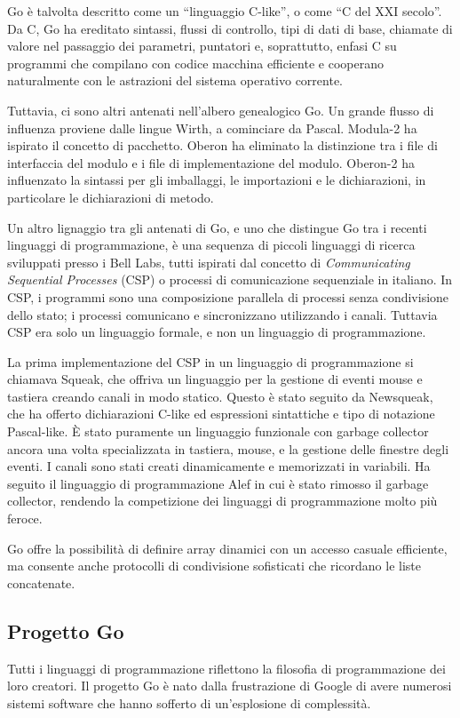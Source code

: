 %
Go è talvolta descritto come un ``linguaggio C-like'', o come ``C del XXI secolo''.
Da C, Go ha ereditato sintassi, flussi di controllo, tipi di dati di base, chiamate di valore nel passaggio dei parametri, puntatori e, soprattutto, enfasi C su programmi che compilano con codice macchina efficiente e cooperano naturalmente con le astrazioni del sistema operativo corrente.

Tuttavia, ci sono altri antenati nell'albero genealogico Go.
Un grande flusso di influenza proviene dalle lingue Wirth, a cominciare da Pascal.
Modula-2 ha ispirato il concetto di pacchetto.
Oberon ha eliminato la distinzione tra i file di interfaccia del modulo e i file di implementazione del modulo.
Oberon-2 ha influenzato la sintassi per gli imballaggi, le importazioni e le dichiarazioni, in particolare le dichiarazioni di metodo.

Un altro lignaggio tra gli antenati di Go, e uno che distingue Go tra i recenti linguaggi di programmazione, è una sequenza di piccoli linguaggi di ricerca sviluppati presso i Bell Labs, tutti ispirati dal concetto di \textit{Communicating Sequential Processes} (CSP) o processi di comunicazione sequenziale in italiano.
In CSP, i programmi sono una composizione parallela di processi senza condivisione dello stato;
i processi comunicano e sincronizzano utilizzando i canali.
Tuttavia CSP era solo un linguaggio formale, e non un linguaggio di programmazione.

La prima implementazione del CSP in un linguaggio di programmazione si chiamava Squeak, che offriva un linguaggio per la gestione di eventi mouse e tastiera creando canali in modo statico.
Questo è stato seguito da Newsqueak, che ha offerto dichiarazioni C-like ed espressioni sintattiche e tipo di notazione Pascal-like.
È stato puramente un linguaggio funzionale con garbage collector ancora una volta specializzata in tastiera, mouse, e la gestione delle finestre degli eventi.
I canali sono stati creati dinamicamente e memorizzati in variabili.
Ha seguito il linguaggio di programmazione Alef in cui è stato rimosso il garbage collector, rendendo la competizione dei linguaggi di programmazione molto più feroce.

Go offre la possibilità di definire array dinamici con un accesso casuale efficiente, ma consente anche protocolli di condivisione sofisticati che ricordano le liste concatenate.

\subsection*{Progetto Go}
Tutti i linguaggi di programmazione riflettono la filosofia di programmazione dei loro creatori.
Il progetto Go è nato dalla frustrazione di Google di avere numerosi sistemi software che hanno sofferto di un'esplosione di complessità.

